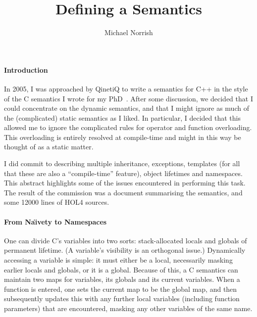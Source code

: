 \documentclass{llncs}
\title{Defining a \cpp{} Semantics}
\author{Michael Norrish}
\institute{Canberra Research Lab., NICTA}
\date{}
\newcommand{\cpp}{\mbox{C\hspace{-.3mm}+\hspace{-.8mm}+}}
\begin{document}
\maketitle

\paragraph{Introduction}
In 2005, I was approached by QinetiQ to write a semantics for \cpp{}
in the style of the C semantics I wrote for my PhD~\cite{Norrish98}.
After some discussion, we decided that I could concentrate on the
dynamic semantics, and that I might ignore as much of the
(complicated) static semantics as I liked.  In particular, I decided
that this allowed me to ignore the complicated rules for operator and
function overloading.  This overloading is entirely resolved at
compile-time and might in this way be thought of as a static matter. 

I did commit to describing multiple inheritance, exceptions, templates
(for all that these are also a ``compile-time'' feature), object
lifetimes and namespaces.  This abstract highlights some of the issues
encountered in performing this task.  The result of the commission was
a document summarising the semantics, and some
\mbox{12\hspace{.8mm}000} lines of HOL4 sources.

\paragraph{From Na\"\i{}vety to Namespaces}
One can divide C's variables into two sorts: stack-allocated locals
and globals of permanent lifetime.  (A variable's visibility is an
orthogonal issue.)  Dynamically accessing a variable is simple: it
must either be a local, necessarily masking earlier locals and
globals, or it is a global.  Because of this, a C semantics can
maintain two maps for variables, its globals and its current
variables.  When a function is entered, one sets the current map to be
the global map, and then subsequently updates this with any further
local variables (including function parameters) that are encountered,
masking any other variables of the same name.
\end{document}
